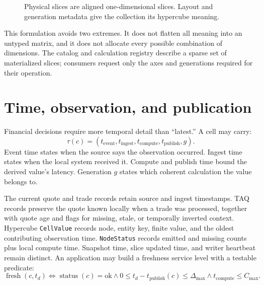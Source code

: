 \documentclass{strategynet-journal}
\begin{document}
\begin{figure}[ht]
\centering
{}
\caption{Physical slices are aligned one-dimensional slices.  Layout and
generation metadata give the collection its hypercube meaning.}
\label{fig:cube-slices}
\end{figure}

This formulation avoids two extremes.  It does not flatten all meaning into an
untyped matrix, and it does not allocate every possible combination of
dimensions.  The catalog and calculation registry describe a sparse set of
materialized slices; consumers request only the axes and generations required
for their operation.

\section{Time, observation, and publication}

Financial decisions require more temporal detail than ``latest.''  A cell may
carry:
\[
  \tau(c)=(t_{\mathrm{event}},t_{\mathrm{ingest}},
           t_{\mathrm{compute}},t_{\mathrm{publish}},g).
\]
Event time states when the source says the observation occurred.  Ingest time
states when the local system received it.  Compute and publish time bound the
derived value's latency.  Generation \(g\) states which coherent calculation
the value belongs to.

The current quote and trade records retain source and ingest timestamps.
TAQ records preserve the quote known locally when a trade was processed,
together with quote age and flags for missing, stale, or temporally inverted
context.  Hypercube \texttt{CellValue} records node, entity key, finite value,
and the oldest contributing observation time.  \texttt{NodeStatus} records
emitted and missing counts plus local compute time.  Snapshot time, slice
updated time, and writer heartbeat remain distinct.  An application may build
a freshness service level with a testable predicate:
\[
  \operatorname{fresh}(c,t_d)
  \iff \operatorname{status}(c)=\mathrm{ok}
  \land 0\le t_d-t_{\mathrm{publish}}(c)\le\Delta_{\max}
  \land t_{\mathrm{compute}}\le C_{\max}.
\]
\end{document}
